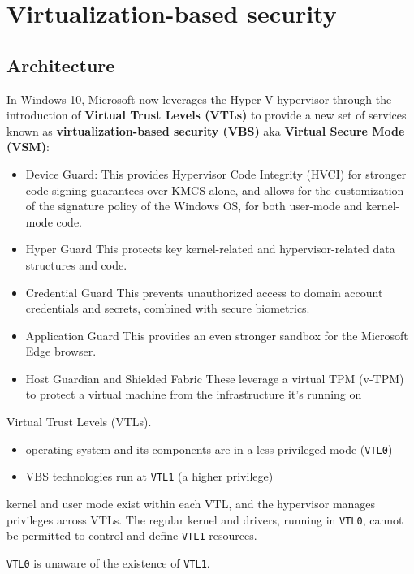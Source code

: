 \section{Virtualization-based security}

\subsection{Architecture}

In Windows 10, Microsoft now leverages the Hyper-V hypervisor through the introduction of {\bf Virtual Trust Levels (VTLs)} to provide a new set of services known as {\bf virtualization-based security (VBS)} aka {\bf Virtual Secure Mode (VSM)}:
\begin{itemize}

    \item Device Guard: This provides Hypervisor Code Integrity (HVCI) for stronger code-signing guarantees over KMCS alone, and allows for the customization of the signature policy of the Windows OS, for both user-mode and kernel-mode code.
    \item Hyper Guard This protects key kernel-related and hypervisor-related data structures and code.
    \item Credential Guard This prevents unauthorized access to domain account credentials and secrets, combined with secure biometrics.
    \item Application Guard This provides an even stronger sandbox for the Microsoft Edge browser.
    \item Host Guardian and Shielded Fabric These leverage a virtual TPM (v-TPM) to protect a virtual machine from the infrastructure it’s running on
\end{itemize}


Virtual Trust Levels (VTLs).
\begin{itemize}
    \item operating system and its components are in a less privileged mode (\verb+VTL0+)
    \item VBS technologies run at \verb+VTL1+ (a higher privilege)
\end{itemize}

kernel and user mode exist within each VTL, and the hypervisor manages privileges across VTLs. The regular kernel and drivers, running in \verb+VTL0+, cannot be permitted to control and define \verb+VTL1+ resources.

\verb+VTL0+ is unaware of the existence of \verb+VTL1+.




